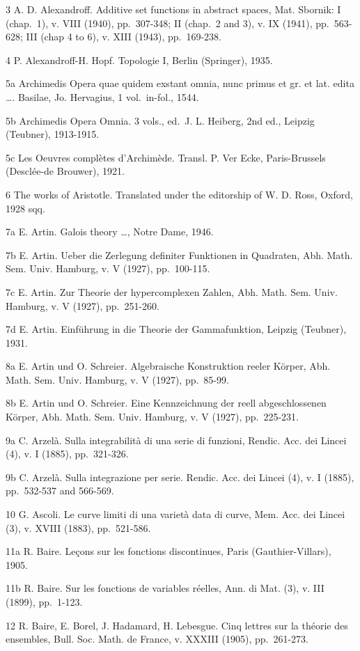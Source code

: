 3 A. D. Alexandroff. Additive set functions in abstract spaces, Mat. Sbornik: I (chap.~1), v. VIII (1940), pp.~307-348; II (chap.~2 and 3), v. IX (1941), pp.~563-628; III (chap 4 to 6), v. XIII (1943), pp.~169-238.

4 P. Alexandroff-H. Hopf. Topologie I, Berlin (Springer), 1935.

5a Archimedis Opera quae quidem exstant omnia, nunc primus et gr. et lat. edita \ldots. Basilae, Jo. Hervagius, 1 vol.~in-fol., 1544.

5b Archimedis Opera Omnia. 3 vols., ed.~J. L. Heiberg, 2nd ed., Leipzig (Teubner), 1913-1915.

5c Les Oeuvres complètes d'Archimède. Transl. P. Ver Ecke, Paris-Brussels (Desclée-de Brouwer), 1921.

6 The works of Aristotle. Translated under the editorship of W. D. Ross, Oxford, 1928 sqq.

7a E. Artin. Galois theory \ldots, Notre Dame, 1946.

7b E. Artin. Ueber die Zerlegung definiter Funktionen in Quadraten, Abh. Math. Sem. Univ. Hamburg, v. V (1927), pp.~100-115.

7c E. Artin. Zur Theorie der hypercomplexen Zahlen, Abh. Math. Sem. Univ. Hamburg, v. V (1927), pp.~251-260.

7d E. Artin. Einführung in die Theorie der Gammafunktion, Leipzig (Teubner), 1931.

8a E. Artin und O. Schreier. Algebraische Konstruktion reeler Körper, Abh. Math. Sem. Univ. Hamburg, v. V (1927), pp.~85-99.

8b E. Artin und O. Schreier. Eine Kennzeichnung der reell abgeschlossenen Körper, Abh. Math. Sem. Univ. Hamburg, v. V (1927), pp.~225-231.

9a C. Arzelà. Sulla integrabilità di una serie di funzioni, Rendic. Acc. dei Lincei (4), v. I (1885), pp.~321-326.

9b C. Arzelà. Sulla integrazione per serie. Rendic. Acc. dei Lincei (4), v. I (1885), pp.~532-537 and 566-569.

10 G. Ascoli. Le curve limiti di una varietà data di curve, Mem. Acc. dei Lincei (3), v. XVIII (1883), pp.~521-586.

11a R. Baire. Leçons sur les fonctions discontinues, Paris (Gauthier-Villars), 1905.

11b R. Baire. Sur les fonctions de variables réelles, Ann. di Mat. (3), v. III (1899), pp.~1-123.

12 R. Baire, E. Borel, J. Hadamard, H. Lebesgue. Cinq lettres sur la théorie des ensembles, Bull. Soc. Math. de France, v. XXXIII (1905), pp.~261-273.

